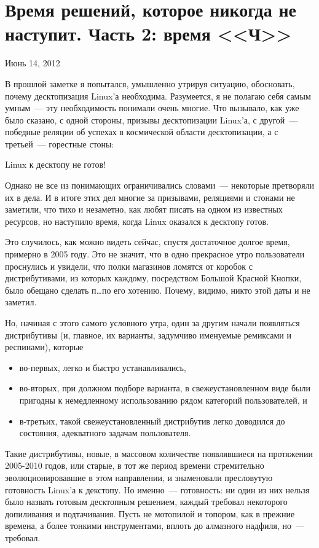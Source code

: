 \section{Время решений, которое никогда не наступит. Часть 2: время <<Ч>>} 
\begin{timeline}Июнь 14, 2012\end{timeline}

В прошлой заметке я попытался, умышленно утрируя ситуацию, обосновать, почему десктопизация Linux'а необходима. Разумеется, я не полагаю себя самым умным~--- эту необходимость понимали очень многие. Что вызывало, как уже было сказано, с одной стороны, призывы десктопизации Linux'а, с другой~--- победные реляции об успехах в космической области десктопизации, а с третьей~--- горестные стоны:
\begin{shadequote}{}
Linux к десктопу не готов!
\end{shadequote}
Однако не все из понимающих ограничивались словами~--- некоторые претворяли их в дела. И в итоге этих дел многие за призывами, реляциями и стонами не заметили, что тихо и незаметно, как любят писать на одном из известных ресурсов, но наступило время, когда Linux оказался к десктопу готов.

Это случилось, как можно видеть сейчас, спустя достаточное долгое время, примерно в 2005 году. Это не значит, что в одно прекрасное утро пользователи проснулись и увидели, что полки магазинов ломятся от коробок с дистрибутивами, из которых каждому, посредством Большой Красной Кнопки, было обещано сделать п\dots по его хотению. Почему, видимо, никто этой даты и не заметил.

Но, начиная с этого самого условного утра, один за другим начали появляться дистрибутивы (и, главное, их варианты, задумчиво именуемые ремиксами и респинами), которые


\begin{itemize}
	\item во-первых, легко и быстро устанавливались,
	\item во-вторых, при должном подборе варианта, в свежеустановленном виде были пригодны к немедленному использованию рядом категорий пользователей, и 
	\item в-третьих, такой свежеустановленный дистрибутив легко доводился до состояния, адекватного задачам пользователя.
\end{itemize}

 

Такие дистрибутивы, новые, в массовом количестве появлявшиеся на протяжении 2005-2010 годов, или старые, в тот же период времени стремительно эволюционировавшие в этом направлении, и знаменовали пресловутую готовность Linux'а к декстопу. Но именно~--- готовность: ни один из них нельзя было назвать готовым десктопным решением, каждый требовал некоторого допиливания и подтачивания. Пусть не мотопилой и топором, как в прежние времена, а более тонкими инструментами, вплоть до алмазного надфиля, но~--- требовал.

